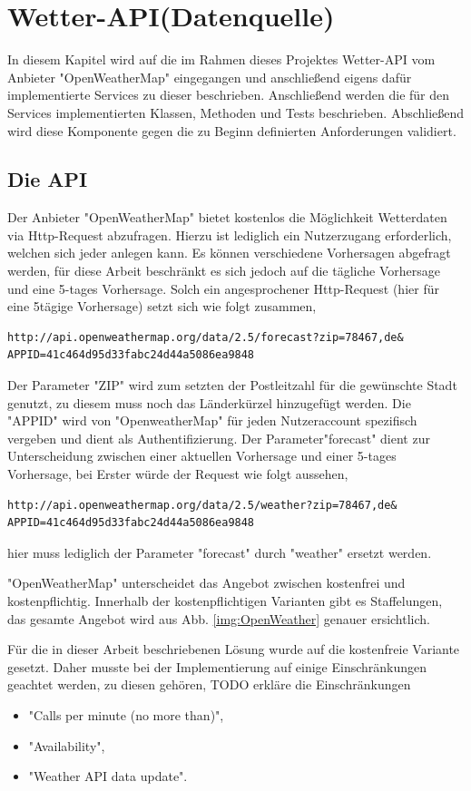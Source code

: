 \section{Wetter-API(Datenquelle)}
In diesem Kapitel wird auf die im Rahmen dieses Projektes Wetter-API vom Anbieter "OpenWeatherMap" eingegangen und anschließend eigens dafür implementierte Services zu dieser beschrieben. Anschließend werden die für den Services implementierten Klassen, Methoden und Tests beschrieben. Abschließend wird diese Komponente gegen die zu Beginn definierten Anforderungen validiert. 
\subsection{Die API}
Der Anbieter "OpenWeatherMap" bietet kostenlos die Möglichkeit Wetterdaten via Http-Request abzufragen. 
Hierzu ist lediglich ein Nutzerzugang erforderlich, welchen sich jeder anlegen kann. Es können verschiedene Vorhersagen abgefragt werden, für diese Arbeit beschränkt es sich jedoch auf die tägliche Vorhersage und eine  5-tages Vorhersage. Solch ein angesprochener Http-Request (hier für eine 5tägige Vorhersage) setzt sich wie folgt zusammen, 
\begin{lstlisting}
http://api.openweathermap.org/data/2.5/forecast?zip=78467,de&
APPID=41c464d95d33fabc24d44a5086ea9848
\end{lstlisting}

Der Parameter "ZIP" wird zum setzten der Postleitzahl für die gewünschte Stadt genutzt, zu diesem muss noch das Länderkürzel hinzugefügt werden. Die "APPID" wird von "OpenweatherMap" für jeden Nutzeraccount spezifisch vergeben und dient als Authentifizierung. Der Parameter"forecast" dient zur Unterscheidung zwischen einer aktuellen Vorhersage und einer 5-tages Vorhersage, bei Erster würde der Request wie folgt aussehen, 

\begin{lstlisting}
http://api.openweathermap.org/data/2.5/weather?zip=78467,de&
APPID=41c464d95d33fabc24d44a5086ea9848
\end{lstlisting}

hier muss lediglich der Parameter "forecast" durch "weather" ersetzt werden. 

"OpenWeatherMap" unterscheidet das Angebot zwischen kostenfrei und kostenpflichtig. Innerhalb der kostenpflichtigen Varianten gibt es Staffelungen, das gesamte Angebot wird aus Abb. \ref{img:OpenWeather} genauer ersichtlich. 

Für die in dieser Arbeit beschriebenen Lösung wurde auf die kostenfreie Variante gesetzt. Daher musste bei der Implementierung auf einige Einschränkungen geachtet werden, zu diesen gehören, 
TODO erkläre die Einschränkungen
\begin{itemize}
\item "Calls per minute (no more than)",
\item "Availability",
\item "Weather API data update".
\end{itemize}

